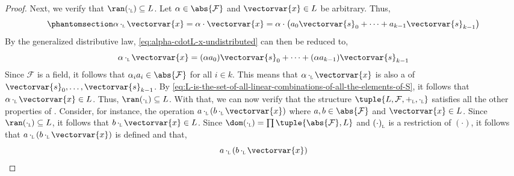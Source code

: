 \begin{proof}
    \vspace{0.3cm}
    \noindent
    Next, we verify that \( \ran (\smallsubscript{\cdot}{L}) \subseteq L \).
    Let \( \alpha \in \abs{\mathcal{F}} \) and \( \vectorvar{x} \in L \) be arbitrary.
    Thus,
    \begin{align}
        \phantomsection \label{eq:alpha-cdotL-x-undistributed}
        \alpha \, \smallsubscript{\cdot}{L} \, \vectorvar{x}
        = \alpha \cdot \vectorvar{x}
        = \alpha \cdot \big( a_{0}\vectorvar{s}_{0} + \cdots + a_{k-1}\vectorvar{s}_{k-1} \big)
    \end{align}
    By the generalized distributive law, \eqref{eq:alpha-cdotL-x-undistributed} can then be reduced to,
    \begin{equation}
        \alpha \, \smallsubscript{\cdot}{L} \, \vectorvar{x} =
        \mleft( \alpha a_{0} \mright)\vectorvar{s}_{0} + \cdots + \mleft( \alpha a_{k-1} \mright)\vectorvar{s}_{k-1}
    \end{equation}
    Since \( \mathcal{F} \) is a field, it follows that \( \alpha_{i}a_{i} \in \abs{\mathcal{F}} \) for all \( i \in k \). This means that
    \( \alpha \, \smallsubscript{\cdot}{L} \, \vectorvar{x} \) is also a 
    of \( \vectorvar{s}_{0}, \dots, \vectorvar{s}_{k-1} \).
    By \eqref{eq:L-is-the-set-of-all-linear-combinations-of-all-the-elements-of-S}, it follows that \( \alpha \, \smallsubscript{\cdot}{L} \, \vectorvar{x} \in L \).
    Thus, \( \ran (\smallsubscript{\cdot}{L}) \subseteq L \).
    With that, we can now verify that the structure \( \tuple{L, \mathcal{F}, \smallsubscript{+}{L}, \smallsubscript{\cdot}{L}} \) satisfies all the other properties of
    .
    Consider, for instance, the operation \( a \, \smallsubscript{\cdot}{L} \, \mleft( b \, \smallsubscript{\cdot}{L} \, \vectorvar{x} \mright) \)
    where \( a, b \in \abs{\mathcal{F}} \) and \( \vectorvar{x} \in L \).
    Since \( \ran (\smallsubscript{\cdot}{L}) \subseteq L \), it follows that \( b \, \smallsubscript{\cdot}{L} \, \vectorvar{x} \in L \).
    Since \( \dom (\smallsubscript{\cdot}{L}) = \prod \tuple{\abs{\mathcal{F}}, L} \) and \( \smallsubscript{(\cdot)}{L} \) is a restriction of \( (\cdot) \),
    it follows that \( a \, \smallsubscript{\cdot}{L} \, \mleft( b \, \smallsubscript{\cdot}{L} \, \vectorvar{x} \mright) \) is defined and that,
    \begin{equation*}
        a \, \smallsubscript{\cdot}{L} \, \mleft( b \, \smallsubscript{\cdot}{L} \, \vectorvar{x} \mright)

\end{equation*}
\end{proof}
